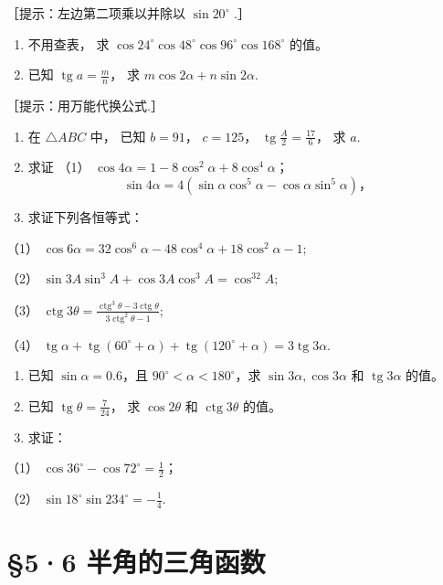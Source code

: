 ［提示：左边第二项乘以并除以 \(\sin 20^{\circ}\) .］

\begin{enumerate}[start=12]
\item
  不用查表， 求
  \(\cos 24^{\circ} \cos 48^{\circ} \cos 96^{\circ} \cos 168^{\circ}\)
  的值。
\item
  已知 \(\operatorname{tg} a = \frac{m}{n}\)， 求
  \(m \cos 2\alpha + n \sin 2\alpha\).
\end{enumerate}

［提示：用万能代换公式.］

\begin{enumerate}[start=14]
\item
  在 \(\triangle ABC\) 中， 已知 \(b = 91\)， \(c = 125\)，
  \(\operatorname{tg} \frac{A}{2} = \frac{17}{6}\)， 求 \(a\).
\item
  求证 （1） \(\cos 4\alpha = 1 - 8\cos^2\alpha + 8\cos^4\alpha\)；
\[
\sin 4 \alpha = 4 (\sin \alpha \cos^ {5} \alpha - \cos \alpha \sin^ {5} \alpha)\text{，} \tag {2}
\]
\item
  求证下列各恒等式：
\end{enumerate}

（1）
\(\cos 6\alpha = 32\cos^6\alpha - 48\cos^4\alpha + 18\cos^2\alpha - 1;\)

（2） \(\sin 3A\sin^3 A + \cos 3A\cos^3 A = \cos^32A;\)

（3）
\(\operatorname{ctg} 3\theta = \frac{\operatorname{ctg}^3\theta - 3\operatorname{ctg}\theta}{3\operatorname{ctg}^2\theta - 1};\)

（4）
\(\operatorname{tg} \alpha + \operatorname{tg}(60^{\circ} + \alpha) + \operatorname{tg}(120^{\circ} + \alpha) = 3 \operatorname{tg} 3\alpha\).

\begin{enumerate}[start=17]
\item
  已知 \(\sin \alpha = 0.6\)，且
  \(90^{\circ} < \alpha < 180^{\circ}\)，求
  \(\sin 3\alpha, \cos 3\alpha\) 和 \(\operatorname{tg} 3\alpha\) 的值。
\item
  已知 \(\operatorname{tg} \theta = \frac{7}{24}\)， 求 \(\cos 2\theta\)
  和 \(\operatorname{ctg} 3\theta\) 的值。
\item
  求证：
\end{enumerate}

（1） \(\cos 36^{\circ} - \cos 72^{\circ} = \frac{1}{2}\)；

（2） \(\sin 18^{\circ} \sin 234^{\circ} = -\frac{1}{4}\).

\section{§5·6 半角的三角函数}

